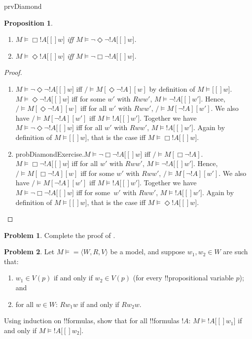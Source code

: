 \documentclass[10pt,a4paper]{article}
\makeatletter
\theoremstyle{plain}
\newtheorem{prop}[thm]{Proposition}
\theoremstyle{definition}
\newtheorem{prob}{Problem}[section]
\theoremstyle{remark}
\newenvironment{probtag}[1]{\begin{prob}}{\end{prob}}
\newcommand*{\ollabel}[1]{\label{#1}}
\newcommand{\olref}{\@ifnextchar[{\olref@i}{\olref@final}}
\def\olref@i[#1]{\@ifnextchar[{\olref@ii}{\olref@final}}
\def\olref@ii[#1]{\@ifnextchar[{\olref@iii}{\olref@final}}
\def\olref@iii[#1]{\olref@final}
\def\olref@final#1{\ref{#1}}
\providecommand{\mSat}[3]{\ensuremath{#1 \models #2[#3]}}
\providecommand{\mModel}[2]{\ensuremath{#1 \models #2}}
\providecommand{\tuple}[1]{\langle #1 \rangle}
\providecommand{\iftag}[1]{#1}
\makeatother
\begin{document}
\begin{tagblock}{prvDiamond}
\begin{prop}\ollabel{prop:dual}
  \begin{enumerate}
  \item $\mSat{M}{\Box !A}[w]$ iff $\mSat{M}{\lnot\Diamond\lnot !A}[w]$.
  \item $\mSat{M}{\Diamond !A}[w]$ iff $\mSat{M}{\lnot\Box\lnot !A}[w]$.
  \end{enumerate}
\end{prop}

\begin{proof}
  \begin{enumerate}
    \item $\mSat{M}{\lnot\Diamond\lnot !A}[w]$ iff $\mSat/{M}{\Diamond\lnot
      !A}[w]$ by definition of $\mSat{M}{}[w]$. $\mSat{M}{\Diamond\lnot
      !A}[w]$ iff for some $w'$ with $Rww'$, $\mSat{M}{\lnot
      !A}[w']$. Hence, $\mSat/{M}{\Diamond\lnot !A}[w]$ iff for all
    $w'$ with $Rww'$, $\mSat/{M}{\lnot !A}[w']$. We also have
    $\mSat/{M}{\lnot !A}[w']$ iff $\mSat{M}{!A}[w']$. Together we have
    $\mSat{M}{\lnot\Diamond\lnot !A}[w]$ iff for all $w'$ with $Rww'$,
    $\mSat{M}{!A}[w']$. Again by definition of $\mSat{M}{}[w]$, that
      is the case iff $\mSat{M}{\Box !A}[w]$.
    \item \iftag{probDiamond}{Exercise.}{$\mSat{M}{\lnot\Box\lnot !A}[w]$ iff
      $\mSat/{M}{\Box\lnot !A}$. $\mSat{M}{\Box\lnot !A}[w]$ iff for all
      $w'$ with $Rww'$, $\mSat{M}{\lnot !A}[w']$. Hence,
      $\mSat/{M}{\Box\lnot !A}[w]$ iff for some $w'$ with $Rww'$,
      $\mSat/{M}{\lnot !A}[w']$. We also have $\mSat/{M}{\lnot
        !A}[w']$ iff $\mSat{M}{!A}[w']$. Together we have
      $\mSat{M}{\lnot\Box\lnot !A}[w]$ iff for some~$w'$ with
      $Rww'$, $\mSat{M}{!A}[w']$. Again by definition of
      $\mSat{M}{}[w]$, that is the case iff $\mSat{M}{\Diamond
        !A}[w]$.}
  \end{enumerate}
\end{proof}

\begin{probtag}{probDiamond}
  Complete the proof of \olref[nml][syn][trw]{prop:dual}.
\end{probtag}
\end{tagblock}

\begin{prob}
  Let $\mModel{M} = \tuple{W, R, V}$ be a model, and suppose $w_1, w_2 \in
  W$ are such that:
  \begin{enumerate}
  \item $w_1 \in V(p)$ if and only if $w_2 \in V(p)$ (for every !!{propositional variable} $p$); and
  \item for all $w \in W$: $Rw_1w$ if and only if $Rw_2w$.
  \end{enumerate}
  Using induction on !!{formula}s, show that for all !!{formula}s $!A$:
  $\mSat{M}{!A}[w_1]$ if and only if $\mSat{M}{!A}[w_2]$.
\end{prob}
\end{document}
